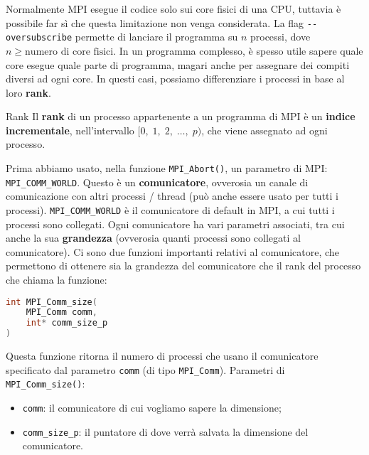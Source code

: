 Normalmente MPI esegue il codice solo sui core fisici di una CPU, tuttavia è possibile far sì che questa limitazione non venga considerata. La flag \verb|--oversubscribe| permette di lanciare il programma su $n$ processi, dove $n \geq \text{numero di core fisici}$.
\nwl
In un programma complesso, è spesso utile sapere quale core esegue quale parte di programma, magari anche per assegnare dei compiti diversi ad ogni core. In questi casi, possiamo differenziare i processi in base al loro \textbf{rank}.

\begin{definition}{Rank}
    Il \textbf{rank} di un processo appartenente a un programma di MPI è un \textbf{indice incrementale}, nell'intervallo $[0, \; 1, \; 2, \; \dots , \; p)$, che viene assegnato ad ogni processo.
\end{definition}

Prima abbiamo usato, nella funzione \verb|MPI_Abort()|, un parametro di MPI: \verb|MPI_COMM_WORLD|. Questo è un \textbf{comunicatore}, ovverosia un canale di comunicazione con altri processi / thread (può anche essere usato per tutti i processi). \verb|MPI_COMM_WORLD| è il comunicatore di default in MPI, a cui tutti i processi sono collegati. Ogni comunicatore ha vari parametri associati, tra cui anche la sua \textbf{grandezza} (ovverosia quanti processi sono collegati al comunicatore). Ci sono due funzioni importanti relativi al comunicatore, che permettono di ottenere sia la grandezza del comunicatore che il rank del processo che chiama la funzione:

\begin{codedefine}
    \begin{lstlisting}[language = C, numbers = none]
int MPI_Comm_size(
    MPI_Comm comm,
    int* comm_size_p
)\end{lstlisting}
    \manlower
    Questa funzione ritorna il numero di processi che usano il comunicatore specificato dal parametro \verb|comm| (di tipo \verb|MPI_Comm|).
    \nwl
    Parametri di \verb|MPI_Comm_size()|:
    \begin{itemize}
        \item \verb|comm|: il comunicatore di cui vogliamo sapere la dimensione;
        \item \verb|comm_size_p|: il puntatore di dove verrà salvata la dimensione del comunicatore.
    \end{itemize}
\end{codedefine}


